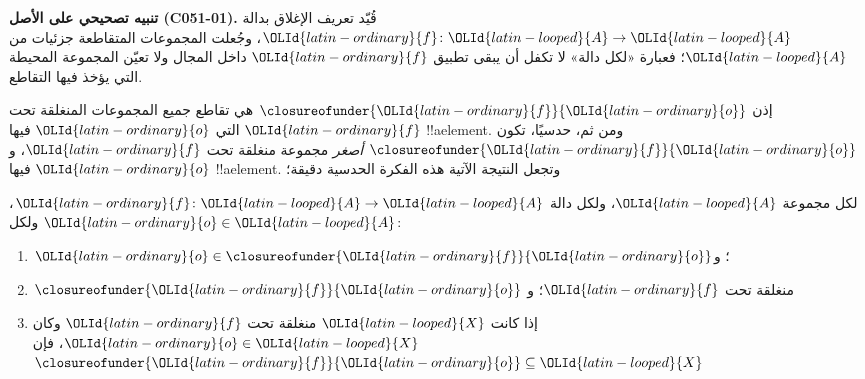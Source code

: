 \documentclass[../../../include/open-logic-section]{subfiles}
\begin{document}
\textbf{تنبيه تصحيحي على الأصل (C051-01).} قُيّد تعريف الإغلاق بدالة
${\OLId{latin-ordinary}{f}}\colon {\OLId{latin-looped}{A}}\to {\OLId{latin-looped}{A}}$، وجُعلت المجموعات المتقاطعة جزئيات من ${\OLId{latin-looped}{A}}$؛ فعبارة
«لكل دالة» لا تكفل أن يبقى تطبيق ${\OLId{latin-ordinary}{f}}$ داخل المجال ولا تعيّن المجموعة
المحيطة التي يؤخذ فيها التقاطع.

إذن $\closureofunder{{\OLId{latin-ordinary}{f}}}{{\OLId{latin-ordinary}{o}}}$ هي تقاطع جميع المجموعات المنغلقة تحت ${\OLId{latin-ordinary}{f}}$
التي ${\OLId{latin-ordinary}{o}}$ فيها !!a{element}. ومن ثم، حدسيًا، تكون
$\closureofunder{{\OLId{latin-ordinary}{f}}}{{\OLId{latin-ordinary}{o}}}$ \emph{أصغر} مجموعة منغلقة تحت ${\OLId{latin-ordinary}{f}}$، و${\OLId{latin-ordinary}{o}}$ فيها
!!a{element}. وتجعل النتيجة الآتية هذه الفكرة الحدسية دقيقة؛
\begin{lem}
	لكل مجموعة ${\OLId{latin-looped}{A}}$، ولكل دالة ${\OLId{latin-ordinary}{f}}\colon {\OLId{latin-looped}{A}}\to {\OLId{latin-looped}{A}}$، ولكل ${\OLId{latin-ordinary}{o}} \in {\OLId{latin-looped}{A}}$:
	\begin{enumerate}
		\item{} ${\OLId{latin-ordinary}{o}} \in \closureofunder{{\OLId{latin-ordinary}{f}}}{{\OLId{latin-ordinary}{o}}}$؛ و
		\item{} $\closureofunder{{\OLId{latin-ordinary}{f}}}{{\OLId{latin-ordinary}{o}}}$ منغلقة تحت ${\OLId{latin-ordinary}{f}}$؛ و
		\item{} إذا كانت ${\OLId{latin-looped}{X}}$ منغلقة تحت ${\OLId{latin-ordinary}{f}}$ وكان ${\OLId{latin-ordinary}{o}} \in
		{\OLId{latin-looped}{X}}$، فإن $\closureofunder{{\OLId{latin-ordinary}{f}}}{{\OLId{latin-ordinary}{o}}} \subseteq {\OLId{latin-looped}{X}}$
	\end{enumerate}
\end{lem}
\end{document}

